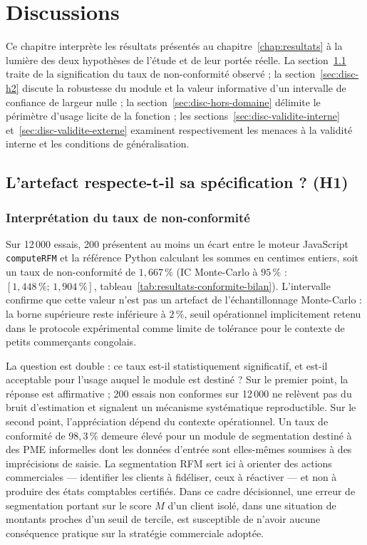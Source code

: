 \chapter{Discussions}
\label{chap:discussions}

Ce chapitre interprète les résultats présentés au chapitre~\ref{chap:resultats} à la lumière
des deux hypothèses de l'étude et de leur portée réelle. La section~\ref{sec:disc-h1} traite
de la signification du taux de non-conformité observé ; la section~\ref{sec:disc-h2} discute
la robustesse du module et la valeur informative d'un intervalle de confiance de largeur nulle ;
la section~\ref{sec:disc-hors-domaine} délimite le périmètre d'usage licite de la fonction ;
les sections~\ref{sec:disc-validite-interne} et~\ref{sec:disc-validite-externe} examinent
respectivement les menaces à la validité interne et les conditions de généralisation.

\section{L'artefact respecte-t-il sa spécification ? (H1)}
\label{sec:disc-h1}

\subsection{Interprétation du taux de non-conformité}
\label{subsec:disc-h1-taux}

Sur 12\,000 essais, 200 présentent au moins un écart entre le moteur JavaScript
\texttt{computeRFM} et la référence Python calculant les sommes en centimes entiers, soit un
taux de non-conformité de $1{,}667\,\%$ (IC Monte-Carlo à $95\,\%$ : $[1{,}448\,\% ;\, 1{,}904\,\%]$,
tableau~\ref{tab:resultats-conformite-bilan}). L'intervalle confirme que cette valeur n'est
pas un artefact de l'échantillonnage Monte-Carlo : la borne supérieure reste inférieure à
$2\,\%$, seuil opérationnel implicitement retenu dans le protocole expérimental comme limite
de tolérance pour le contexte de petits commerçants congolais.

La question est double : ce taux est-il statistiquement significatif, et est-il acceptable
pour l'usage auquel le module est destiné ? Sur le premier point, la réponse est affirmative ;
200 essais non conformes sur 12\,000 ne relèvent pas du bruit d'estimation et signalent un
mécanisme systématique reproductible. Sur le second point, l'appréciation dépend du contexte
opérationnel. Un taux de conformité de $98{,}3\,\%$ demeure élevé pour un module de
segmentation destiné à des PME informelles dont les données d'entrée sont elles-mêmes soumises
à des imprécisions de saisie. La segmentation RFM sert ici à orienter des actions commerciales
— identifier les clients à fidéliser, ceux à réactiver — et non à produire des états
comptables certifiés. Dans ce cadre décisionnel, une erreur de segmentation portant sur le
score $M$ d'un client isolé, dans une situation de montants proches d'un seuil de tercile,
est susceptible de n'avoir aucune conséquence pratique sur la stratégie commerciale adoptée.

